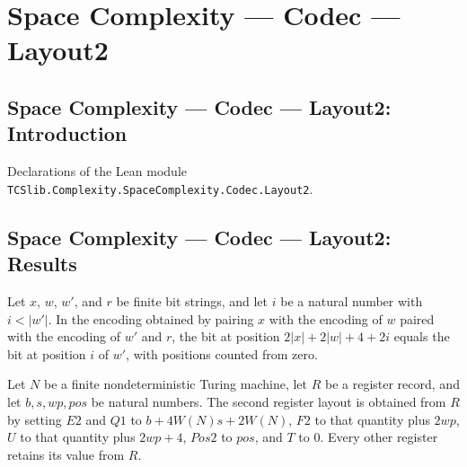 \section{Space Complexity --- Codec --- Layout2}
\subsection*{Space Complexity --- Codec --- Layout2: Introduction}

Declarations of the Lean module \texttt{TCSlib.Complexity.SpaceComplexity.Codec.Layout2}.

\subsection*{Space Complexity --- Codec --- Layout2: Results}

\begin{lemma}
\label{Complexity.Codec.getD_w2}
\leanok
{}
Let $x$, $w$, $w'$, and $r$ be finite bit strings, and let $i$ be a natural number with
$i<|w'|$. In the encoding obtained by pairing $x$ with the encoding of $w$ paired with
the encoding of $w'$ and $r$, the bit at position $2|x|+2|w|+4+2i$ equals the bit at
position $i$ of $w'$, with positions counted from zero.
\end{lemma}

\begin{definition}
\label{Complexity.Codec.lay2R}
\leanok
{}
Let $N$ be a finite nondeterministic Turing machine, let $R$ be a register record, and
let $b,s,wp,pos$ be natural numbers. The second register layout is obtained from $R$ by
setting $E2$ and $Q1$ to $b+4W(N)s+2W(N)$, $F2$ to that quantity plus $2wp$, $U$ to that
quantity plus $2wp+4$, $Pos2$ to $pos$, and $T$ to $0$. Every other register retains its
value from $R$.
\end{definition}

